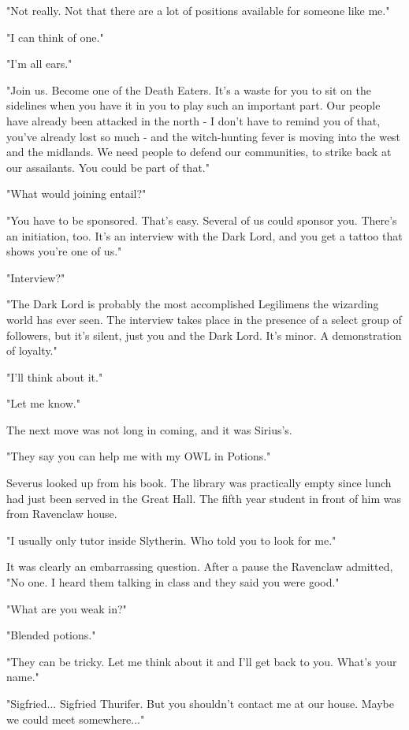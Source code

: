 "Not really. Not that there are a lot of positions available for someone like me."

"I can think of one."

"I'm all ears."

"Join us. Become one of the Death Eaters. It's a waste for you to sit on the sidelines when you have it in you to play such an important part. Our people have already been attacked in the north - I don't have to remind you of that, you've already lost so much - and the witch-hunting fever is moving into the west and the midlands. We need people to defend our communities, to strike back at our assailants. You could be part of that."

"What would joining entail?"

"You have to be sponsored. That's easy. Several of us could sponsor you. There's an initiation, too. It's an interview with the Dark Lord, and you get a tattoo that shows you're one of us."

"Interview?"

"The Dark Lord is probably the most accomplished Legilimens the wizarding world has ever seen. The interview takes place in the presence of a select group of followers, but it's silent, just you and the Dark Lord. It's minor. A demonstration of loyalty."

"I'll think about it."

"Let me know."

The next move was not long in coming, and it was Sirius's.

"They say you can help me with my OWL in Potions."

Severus looked up from his book. The library was practically empty since lunch had just been served in the Great Hall. The fifth year student in front of him was from Ravenclaw house.

"I usually only tutor inside Slytherin. Who told you to look for me."

It was clearly an embarrassing question. After a pause the Ravenclaw admitted, "No one. I heard them talking in class and they said you were good."

"What are you weak in?"

"Blended potions."

"They can be tricky. Let me think about it and I'll get back to you. What's your name."

"Sigfried... Sigfried Thurifer. But you shouldn't contact me at our house. Maybe we could meet somewhere..."

